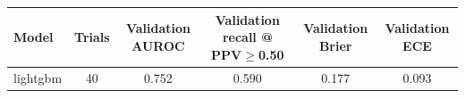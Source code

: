 \begin{tabular}{@{}lccccc@{}}
\toprule
Model & Trials & Validation AUROC & Validation recall @ PPV$\geq$0.50 & Validation Brier & Validation ECE\\
\midrule
lightgbm & 40 & 0.752 & 0.590 & 0.177 & 0.093\\
\bottomrule
\end{tabular}
